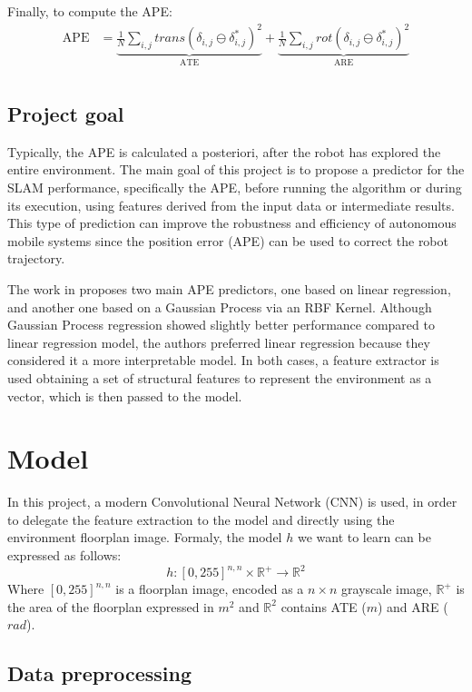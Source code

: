 \documentclass[a4paper]{article}
\begin{document}
Finally, to compute the APE: 
$$
\begin{aligned}
    \displaystyle
    \text{APE} &= \underbrace{\frac{1}{N}\sum_{i,j}trans(\delta_{i,j}\ominus\delta^*_{i,j})^2}_{\text{ATE}}+
                  \underbrace{\frac{1}{N}\sum_{i,j}rot(\delta_{i,j}\ominus\delta^*_{i,j})^2}_{\text{ARE}} \\
\end{aligned}
$$

\subsection{Project goal}
Typically, the APE is calculated a posteriori, after the robot has explored the entire environment. The main
goal of this project is to propose a predictor for the SLAM performance, specifically the APE, before running 
the algorithm or during its execution, using features derived from the input data or intermediate results.
This type of prediction can improve the robustness and efficiency of autonomous mobile systems since the 
position error (APE) can be used to correct the robot trajectory.

The work in \cite{Luperto} proposes two main APE predictors, one based on linear regression, and another one
based on a Gaussian Process via an RBF Kernel. Although Gaussian Process regression showed slightly better
performance compared to linear regression model, the authors preferred linear regression because they
considered it a more interpretable model. In both cases, a feature extractor is used \cite{Luperto2} obtaining
a set of structural features to represent the environment as a vector, which is then passed to the model.


\section{Model}
In this project, a modern Convolutional Neural Network (CNN) is used, in order to delegate the feature 
extraction to the model and directly using the environment floorplan image.
Formaly, the model $h$ we want to learn can be expressed as follows:
$$ h: [0,255]^{n,n} \times \mathbb{R}^+ \rightarrow \mathbb{R}^2 $$
Where $[0,255]^{n,n}$ is a floorplan image, encoded as a $n\times n$ grayscale image, $\mathbb{R}^+$ is the
area of the floorplan expressed in $m^2$ and $\mathbb{R}^2$ contains ATE ($m$)
and ARE ($rad$).

\subsection{Data preprocessing}

\clearpage
\printbibliography
\end{document}
